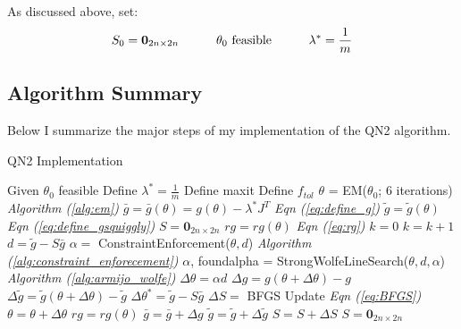 \documentclass[letter,12pt]{article}
\begin{document}
As discussed above, set:
\[
S_0 = \boldsymbol{0}_{2n \times 2n}
\indent \indent
\theta_0 \text{ feasible}
\indent \indent
\lambda^* = \frac{1}{m}
\]

\subsection{Algorithm Summary}

Below I summarize the major steps of my implementation of the QN2 algorithm.

\begin{algorithm} [H]
\caption{QN2 Implementation}
\label{alg:qn2}
\begin{algorithmic}[1]
\State Given $\theta_0$ feasible
\State Define $\lambda^* = \frac{1}{m}$
\State Define maxit
\State Define $f_{tol}$
\State $\theta$ = EM($\theta_0$; $6$ iterations)
\indent \indent  \indent\indent \indent \indent \indent \indent  \textit{Algorithm (\ref{alg:em})}
\State $\bar{g} = \bar{g}(\theta) = g(\theta) - \lambda^*J^T$
\indent  \indent \indent\indent \indent \indent \indent \indent \space  \textit{Eqn (\ref{eq:define_g})}
\State $\tilde{g} = \tilde{g}(\theta)$
\indent \indent \indent \indent \indent \indent\indent \indent \indent \indent \indent \space \space \space \textit{Eqn (\ref{eq:define_gsquiggly})}
\State $S = \boldsymbol{0}_{2n \times 2n}$
\State $rg = rg(\theta)$
\indent \indent \indent \indent \indent \indent\indent \indent \indent \indent \indent  \textit{Eqn (\ref{eq:rg})}
\State $k = 0$
\State $k = k + 1$
\State $d = \tilde{g} - S\bar{g}$
\State $\alpha = $ ConstraintEnforcement($\theta,d$) 
\indent \indent \indent \indent \indent \space \space \textit{Algorithm (\ref{alg:constraint_enforecement})}
\State $\alpha$, foundalpha = StrongWolfeLineSearch($\theta,d,\alpha$) 
\indent \indent \textit{Algorithm (\ref{alg:armijo_wolfe})}
\State $\Delta\theta = \alpha d$
\State $\Delta g = g(\theta+\Delta\theta) - g$
\State $\Delta \tilde{g} = \tilde{g}(\theta + \Delta\theta) - \tilde{g}$
\State $\Delta \theta^* = \tilde{g} - S\bar{g}$
\State $\Delta S = $ BFGS Update 
\indent \indent \indent \indent \indent \indent \indent \space \space \textit{Eqn (\ref{eq:BFGS})}
\State $\theta = \theta + \Delta\theta$
\State $rg = rg(\theta)$
\State $\bar{g} = \bar{g}+\Delta g$
\State $\tilde{g} = \tilde{g}+\Delta \tilde{g}$
\State $S = S +\Delta S$
\Else
\State $S = \boldsymbol{0}_{2n \times 2n}$
\EndIf
\EndWhile
\end{algorithmic}
\end{algorithm}
\end{document}
